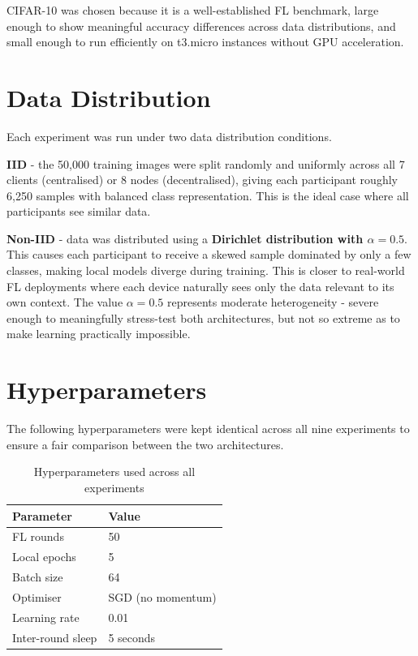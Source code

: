 \documentclass[12pt]{report}
\begin{document}
CIFAR-10 was chosen because it is a well-established FL benchmark, large enough
to show meaningful accuracy differences across data distributions, and small
enough to run efficiently on t3.micro instances without GPU acceleration.

\section{Data Distribution}

Each experiment was run under two data distribution conditions.

\textbf{IID} - the 50,000 training images were split randomly and uniformly
across all 7 clients (centralised) or 8 nodes (decentralised), giving each
participant roughly 6,250 samples with balanced class representation. This is
the ideal case where all participants see similar data.

\textbf{Non-IID} - data was distributed using a \textbf{Dirichlet distribution
with $\alpha = 0.5$}. This causes each participant to receive a skewed sample
dominated by only a few classes, making local models diverge during training.
This is closer to real-world FL deployments where each device naturally sees
only the data relevant to its own context. The value $\alpha = 0.5$ represents
moderate heterogeneity - severe enough to meaningfully stress-test both
architectures, but not so extreme as to make learning practically impossible.

\section{Hyperparameters}

The following hyperparameters were kept identical across all nine experiments to
ensure a fair comparison between the two architectures.

\begin{table}[H]
\centering
\caption{Hyperparameters used across all experiments}
\label{tab:hyperparams}
\begin{tabular}{ll}
\toprule
\textbf{Parameter} & \textbf{Value} \\
\midrule
FL rounds          & 50 \\
Local epochs       & 5 \\
Batch size         & 64 \\
Optimiser          & SGD (no momentum) \\
Learning rate      & 0.01 \\
Inter-round sleep  & 5 seconds \\
\bottomrule
\end{tabular}
\end{table}
\end{document}
